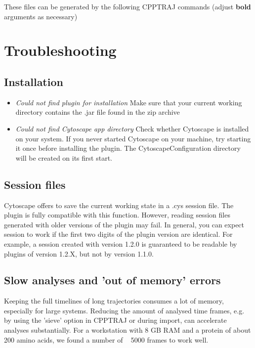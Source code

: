 These files can be generated by the following CPPTRAJ commands (adjust \textbf{bold} arguments as necessary)


\section{Troubleshooting}

\subsection{Installation}
\begin{itemize}
  \item \textit{Could not find plugin for installation} Make sure that your current working directory contains the .jar file found in the zip archive
 \item \textit{Could not find Cytoscape app directory} Check whether Cytoscape is installed on your system. If you never started Cytoscape on your machine, try starting it once before installing the plugin. The CytoscapeConfiguration directory will be created on its first start.
 \end{itemize}

 \subsection{Session files}
Cytoscape offers to save the current working state in a .cys session file. The plugin is fully compatible with this function. However, reading session files generated with older versions of the plugin may fail. In general, you can expect session to work if the first two digits of the plugin version are identical. For example, a session created with version 1.2.0 is guaranteed to be readable by plugins of version 1.2.X, but not by version 1.1.0. 

\subsection{Slow analyses and 'out of memory' errors}
Keeping the full timelines of long trajectories consumes a lot of memory, especially for large systems. Reducing the amount of analysed time frames, e.g. by using the 'sieve' option in CPPTRAJ or during import, can accelerate analyses substantially. For a workstation with 8 GB RAM and a protein of about 200 amino acids, we found a number of ~ 5000 frames to work well.  

